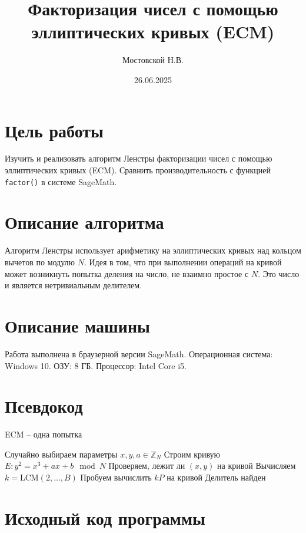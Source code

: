\documentclass[12pt]{article}
\title{Факторизация чисел с помощью эллиптических кривых (ECM)}
\author{Мостовской Н.В.}
\date{26.06.2025}
\begin{document}
\maketitle

\section*{Цель работы}
Изучить и реализовать алгоритм Ленстры факторизации чисел с помощью эллиптических кривых (ECM). Сравнить производительность с функцией \texttt{factor()} в системе SageMath.

\section*{Описание алгоритма}
Алгоритм Ленстры использует арифметику на эллиптических кривых над кольцом вычетов по модулю $N$. Идея в том, что при выполнении операций на кривой может возникнуть попытка деления на число, не взаимно простое с $N$. Это число и является нетривиальным делителем.

\section*{Описание машины}
Работа выполнена в браузерной версии SageMath. Операционная система: Windows 10. ОЗУ: 8 ГБ. Процессор: Intel Core i5.

\section*{Псевдокод}
\begin{algorithm}[H]
\caption{ECM – одна попытка}
\begin{algorithmic}[1]
\State Случайно выбираем параметры $x, y, a \in \mathbb{Z}_N$
\State Строим кривую $E: y^2 = x^3 + ax + b \mod N$
\State Проверяем, лежит ли $(x, y)$ на кривой
\State Вычисляем $k = \text{LCM}(2, ..., B)$
\State Пробуем вычислить $kP$ на кривой
  \State Делитель найден
\EndIf
\end{algorithmic}
\end{algorithm}

\section*{Исходный код программы}
\end{document}
